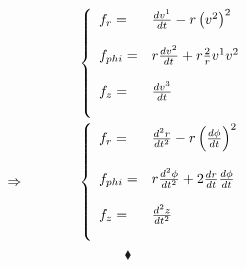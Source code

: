 \begin{align}
&\left\{\begin{array}{lll}
f_r= &\dv{v^1}{t}-r\left(v^2\right)^2\\\\
f_{phi}= &r\dv{v^2}{t}+r\frac{2}{r}v^1 v^2\\\\
f_z= &\dv{v^3}{t}\\\\
\end{array}\right.\\
\Rightarrow \quad\quad\quad\quad &\left\{\begin{array}{lll}
f_r= &\dv[2]{r}{t}-r\left(\dv{\phi}{t}\right)^2\\\\
f_{phi}= &r\dv[2]{\phi}{t}+2\dv{r}{t} \dv{\phi}{t}\\\\
f_z= &\dv[2]{z}{t}\\\\
\end{array}\right.
\end{align}
$$\blacklozenge$$
\newpage



